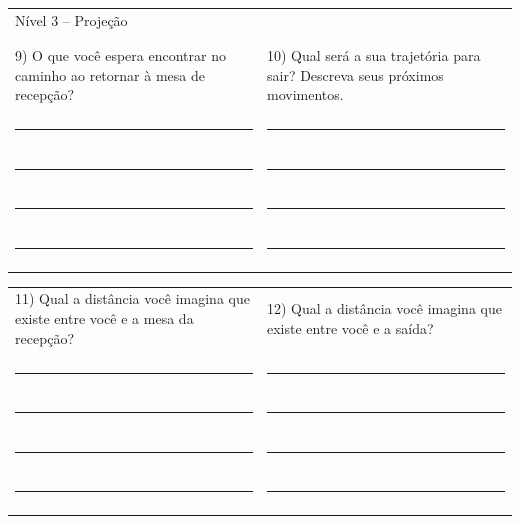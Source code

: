 \begin{table}[!htb]
\begin{tabular}{p{0.5\linewidth} p{0.5\linewidth}}
    \end{tabular}
    \begin{tabular}{p{0.5\linewidth} p{0.5\linewidth}}
        \large{Nível 3 – Projeção}  &\\
        & \\
        & \\
        9)	O que você espera encontrar no caminho ao retornar à mesa de recepção? & 10)	Qual será a sua trajetória para sair? Descreva seus próximos movimentos. \\
        & \\
        \rule{\linewidth}{.2mm} & \rule{\linewidth}{.2mm}\\
        & \\
        \rule{\linewidth}{.2mm} & \rule{\linewidth}{.2mm}\\
        & \\
        \rule{\linewidth}{.2mm} & \rule{\linewidth}{.2mm}\\
        & \\
        \rule{\linewidth}{.2mm} & \rule{\linewidth}{.2mm}\\
        & \\
\end{tabular}
    \begin{tabular}{p{0.5\linewidth} p{0.5\linewidth}}
        11)	Qual a distância você imagina que existe entre você e a mesa da recepção? & 12)	Qual a distância você imagina que existe entre você e a saída? \\
        & \\
        \rule{\linewidth}{.2mm} & \rule{\linewidth}{.2mm}\\
        & \\
        \rule{\linewidth}{.2mm} & \rule{\linewidth}{.2mm}\\
        & \\
        \rule{\linewidth}{.2mm} & \rule{\linewidth}{.2mm}\\
        & \\
        \rule{\linewidth}{.2mm} & \rule{\linewidth}{.2mm}\\
        & \\
    \end{tabular}
\end{table}

\FloatBarrier
\pagebreak

